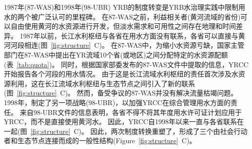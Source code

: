 1987年(87-WAS)和1998年(98-UBR) YRB的制度转变是YRB水治理实践中限制用水的两个被广泛认可的里程碑。
在87-WAS之前，利益相关者(黄河流域的省份)可以自由使用黄河的水资源进行开发，但淡水需求和可用性之间存在地理和时间差异。
1987年以前，长江水利枢纽与各省在用水方面没有联系，各省可以直接与黄河河段相连(图~\ref{fig:structure}~C)。
在87-WAS中，为缩小水资源亏缺，国家主管部门在87-WAS中提出在YR流域10个省(或地区)之间分配特定的水资源配额(表~\ref{tab:quota})。
同时，根据国家部委发布的87-WAS文件中提取的信息，YRCC开始报告各个河段的用水情况。
由于这是长江流域水利枢纽的责任首次涉及水资源利用，这在长江流域水利枢纽与生态节点之间引入了新的联系(图~\ref{fig:structure}~C)。
然而，备受争议的87-WAS并没有解决流量枯竭问题。
1998年，制定了另一项战略(98-UBR)，以加强YRCC在综合管理用水方面的责任。
来自98-UBR文件的信息表明，各省不得不将其年度用水许可证计划应用于YRCC，而不是直接使用黄河水。
因此，YRCC自1998年以来一直与各省联系在一起(图~\ref{fig:structure}~C)。
因此，两次制度转换重塑了，形成了三个由社会行动者和生态节点连接而成的一般性结构(Figure~\ref{fig:structure}~C)。
